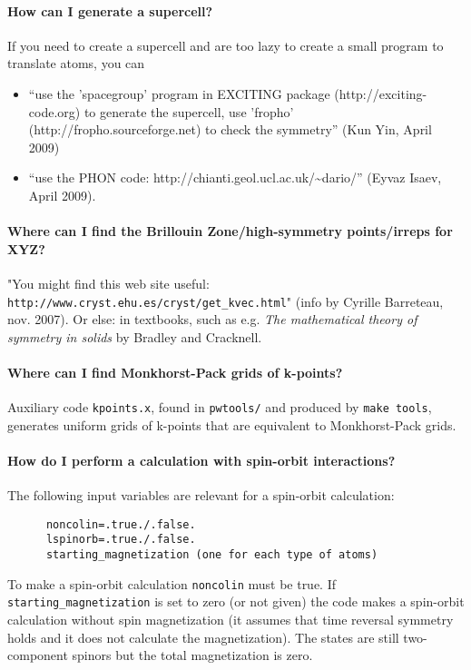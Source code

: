 \documentclass[12pt,a4paper]{article}
\begin{document}
\paragraph{How can I generate a supercell?}

If you need to create a supercell and are too lazy to create a 
small program to translate atoms, you can
\begin{itemize}
\item ``use the 'spacegroup' program in EXCITING package 
(http://exciting-code.org) to generate the supercell,
use 'fropho' (http://fropho.sourceforge.net) to check the symmetry''
(Kun Yin, April 2009)
\item ``use the PHON code: http://chianti.geol.ucl.ac.uk/\~{}dario/''
(Eyvaz Isaev, April 2009).
\end{itemize}

\paragraph{Where can I find the Brillouin Zone/high-symmetry
  points/irreps for XYZ?} 

"You might find this web site useful:
\texttt{http://www.cryst.ehu.es/cryst/get\_kvec.html}" (info by Cyrille
Barreteau, nov. 2007). Or else: in textbooks, such as e.g. {\em The
mathematical theory of symmetry in solids} by Bradley and Cracknell.

\paragraph{Where can I find Monkhorst-Pack grids of k-points?}

Auxiliary code \texttt{kpoints.x}, found in \texttt{pwtools/} and 
produced by \texttt{make tools}, generates uniform grids of k-points 
that are equivalent to Monkhorst-Pack grids. 

\paragraph{How do I perform a calculation with spin-orbit interactions?}

The following input variables are relevant for a spin-orbit
calculation: 
\begin{verbatim}
      noncolin=.true./.false.
      lspinorb=.true./.false.
      starting_magnetization (one for each type of atoms)
\end{verbatim}
To make a spin-orbit calculation \texttt{noncolin} must be true. 
If \texttt{starting\_magnetization} is set to zero (or not given) 
the code makes a spin-orbit calculation without spin magnetization 
(it assumes that time reversal symmetry holds and it does not calculate 
the magnetization). The states are still two-component spinors but the
total magnetization is zero. 
\end{document}
